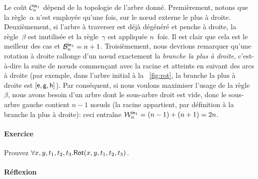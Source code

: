 Le coût \(\C{\fun{in}_1}{n}\) dépend de
la topologie de l'arbre donné. Premièrement, notons que la
règle~\(\alpha\) n'est employée qu'une fois, sur le nœud externe
le plus à droite. Deuxièmement, si l'arbre à traverser est déjà
dégénéré et penche à droite, la
règle~\(\beta\) est inutilisée et la règle~\(\gamma\) est appliquée
\(n\)~fois. Il est clair que cela est le meilleur des cas et
\(\B{\fun{in}_1}{n} = n + 1\).
Troisièmement, nous devrions remarquer qu'une rotation à droite
rallonge d'un nœud exactement la \emph{branche la plus à
  droite}, c'est-à-dire la suite de nœuds
commençant avec la racine et atteints en suivant des arcs à droite
(par exemple, dans l'arbre initial à la \fig~\vref{fig:rot}, la
branche la plus à droite est \([\fun{e}, \fun{g},
\fun{h}]\)). Par conséquent, si nous voulons maximiser l'usage de la
règle~\(\beta\), nous avons besoin d'un arbre dont le sous-arbre droit
est vide, donc le sous-arbre gauche contient \(n-1\) nœuds (la
racine appartient, par définition à la branche la plus à droite): ceci
entraîne \(\W{\fun{in}_1}{n} = (n-1) + (n+1) =
2n\).

\paragraph{Exercice}

Prouvez \(\forall x,y,t_1,t_2,t_3.\pred{Rot}{x,y,t_1,t_2,t_3}\).

\paragraph{Réflexion}

